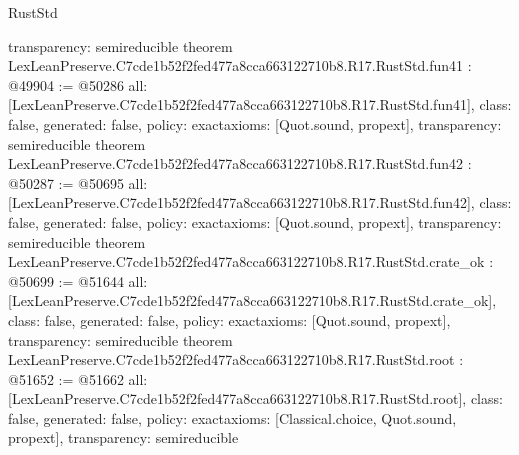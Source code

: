 \begin{lexlean}{RustStd}
\begin{coremodule}
{  transparency: semireducible
}
theorem LexLeanPreserve.C7cde1b52f2fed477a8cca663122710b8.R17.RustStd.fun41 : @49904 := @50286 {
  all: [LexLeanPreserve.C7cde1b52f2fed477a8cca663122710b8.R17.RustStd.fun41],
  class: false,
  generated: false,
  policy: exact{axioms: [Quot.sound, propext]},
  transparency: semireducible
}
theorem LexLeanPreserve.C7cde1b52f2fed477a8cca663122710b8.R17.RustStd.fun42 : @50287 := @50695 {
  all: [LexLeanPreserve.C7cde1b52f2fed477a8cca663122710b8.R17.RustStd.fun42],
  class: false,
  generated: false,
  policy: exact{axioms: [Quot.sound, propext]},
  transparency: semireducible
}
theorem LexLeanPreserve.C7cde1b52f2fed477a8cca663122710b8.R17.RustStd.crate_ok : @50699 := @51644 {
  all: [LexLeanPreserve.C7cde1b52f2fed477a8cca663122710b8.R17.RustStd.crate_ok],
  class: false,
  generated: false,
  policy: exact{axioms: [Quot.sound, propext]},
  transparency: semireducible
}
theorem LexLeanPreserve.C7cde1b52f2fed477a8cca663122710b8.R17.RustStd.root : @51652 := @51662 {
  all: [LexLeanPreserve.C7cde1b52f2fed477a8cca663122710b8.R17.RustStd.root],
  class: false,
  generated: false,
  policy: exact{axioms: [Classical.choice, Quot.sound, propext]},
  transparency: semireducible
}


\end{coremodule}
\end{lexlean}

